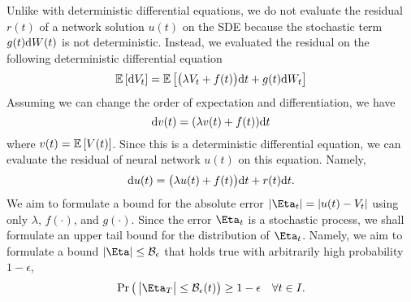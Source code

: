     Unlike with deterministic differential equations, we do not evaluate the residual $r(t)$ of a network solution $u(t)$ on the SDE because the stochastic term $g(t) \mathrm{d} W(t)$ is not deterministic.
    Instead, we evaluated the residual on the following deterministic differential equation
    \begin{equation}
        \mathbb{E}\left[\mathrm{d} V_t\right] = \mathbb{E}\left[\big(\lambda V_t + f(t)\big)\mathrm{d} t + g(t) \mathrm{d} W_t\right]
    \end{equation}
    Assuming we can change the order of expectation and differentiation, we have
    \begin{equation}
        \mathrm{d} v(t) = (\lambda v(t) + f(t))\mathrm{d} t
    \end{equation}
    where $v(t) = \mathbb{E}\left[V(t)\right]$. 
    Since this is a deterministic differential equation, we can evaluate the residual of neural network $u(t)$ on this equation. 
    Namely,
    \begin{equation}\label{eq:linear-sde-network}
        \mathrm{d} u(t) = \big( \lambda u(t) + f(t)\big) \mathrm{d} t + r(t)\mathrm{d} t.
    \end{equation}
    We aim to formulate a bound for the absolute error $|\Eta_t| = |u(t) - V_t|$ using only $\lambda$, $f(\cdot)$, and $g(\cdot)$. 
    Since the error $\Eta_t$ is a stochastic process, we shall formulate an upper tail bound for the distribution of $\Eta_t$. 
    Namely, we aim to formulate a bound $|\Eta| \leq \Bound_\epsilon$ that holds true with arbitrarily high probability $1 - \epsilon$,
    \begin{equation}\label{eq:upper-tail-bound-goal}
        \P{\, \big|\Eta_T\big| \leq \Bound_\epsilon(t)} \geq 1 - \epsilon \quad \forall t \in I.
    \end{equation}
